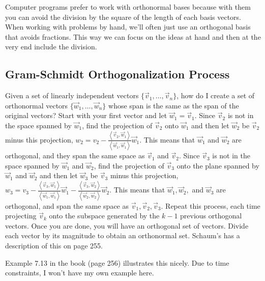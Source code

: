Computer programs prefer to work with orthonormal bases because with them you can avoid the division by the square of the length of each basis vectors.  When working with problems by hand, we'll often just use an orthogonal basis that avoids fractions.  This way we can focus on the ideas at hand and then at the very end include the division.

\subsection{Gram-Schmidt Orthogonalization Process}


Given a set of linearly independent vectors $\{\vec v_1,\ldots,\vec v_n\}$, how do I create a set of orthonormal vectors $\{\vec w_1,\ldots,\vec w_n\}$ whose span is the same as the span of the original vectors?  Start with your first vector and let $\vec w_1 = \vec v_1$.  Since $\vec v_2$ is not in the space spanned by $\vec w_1$, find the projection of $\vec v_2$ onto $\vec w_1$ and then let $\vec w_2$ be $\vec v_2$ minus this projection, $w_2 = v_2 - \frac{\left<\vec v_2,\vec w_1\right>}{\left<\vec w_1,\vec w_1\right>}\vec w_1.$ This means that $\vec w_1$ and $\vec w_2$ are orthogonal, and they span the same space as $\vec v_1$ and $\vec v_2$.  Since $\vec v_3$ is not in the space spanned by $\vec w_1$ and $\vec w_2$, find the projection of $\vec v_3$ onto the plane spanned by $\vec w_1$ and $\vec w_2$ and then let $\vec w_3$ be $\vec v_3$ minus this projection, 
$w_3 = v_3 
- \frac{\left<\vec v_3,\vec w_1\right>}{\left<\vec w_1,\vec w_1\right>}\vec w_1
- \frac{\left<\vec v_3,\vec w_2\right>}{\left<\vec w_2,\vec w_2\right>}\vec w_2.$ This means that $\vec w_1, \vec w_2,$ and $\vec w_3$ are orthogonal, and span the same space as $\vec v_1, \vec v_2, \vec v_3$.  Repeat this process, each time projecting $\vec v_k$ onto the subspace generated by the $k-1$ previous orthogonal vectors.  Once you are done, you will have an orthogonal set of vectors.  Divide each vector by its magnitude to obtain an orthonormal set.  Schaum's has a description of this on page 255.


\begin{example}
Example 7.13 in the book (page 256) illustrates this nicely. Due to time constraints, I won't have my own example here.
\end{example}







